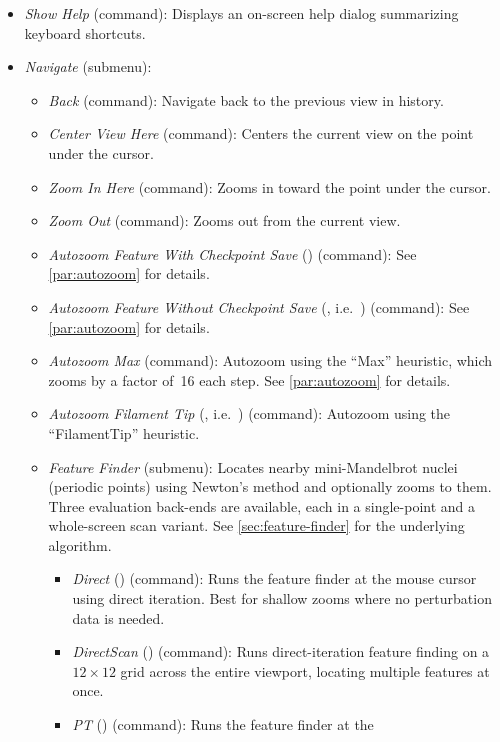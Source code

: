 \begin{itemize}
  \item \emph{Show Help} (command): Displays an on-screen help dialog summarizing keyboard shortcuts.

  \item \emph{Navigate} (submenu):
    \begin{itemize}
      \item \emph{Back} (command): Navigate back to the previous view in history.
      \item \emph{Center View Here} (command): Centers the current view on the
      point under the cursor.
      \item \emph{Zoom In Here} (command): Zooms in toward the point under the cursor.
      \item \emph{Zoom Out} (command): Zooms out from the current view.
      \item \emph{Autozoom Feature With Checkpoint Save} () (command):
      See \cref{par:autozoom} for details.
      \item \emph{Autozoom Feature Without Checkpoint Save}
      (, i.e.\ ) (command): See \cref{par:autozoom} for
      details.
      \item \emph{Autozoom Max} (command): Autozoom using the ``Max'' heuristic,
      which zooms by a factor of~16 each step. See \cref{par:autozoom} for details.
      \item \emph{Autozoom Filament Tip} (, i.e.\ ) (command): Autozoom using the
      ``FilamentTip'' heuristic.
      \item \emph{Feature Finder} (submenu): Locates nearby mini-Mandelbrot
      nuclei (periodic points) using Newton's method and optionally zooms to
      them.  Three evaluation back-ends are available, each in a single-point
      and a whole-screen scan variant.  See
      \cref{sec:feature-finder} for the underlying algorithm.
        \begin{itemize}
          \item \emph{Direct} () (command): Runs the feature finder at
          the mouse cursor using direct iteration.  Best for shallow zooms where
          no perturbation data is needed.
          \item \emph{DirectScan} () (command): Runs direct-iteration
          feature finding on a $12\times12$ grid across the entire viewport,
          locating multiple features at once.
          \item \emph{PT} () (command): Runs the feature finder at the

\end{itemize}
\end{itemize}
\end{itemize}
